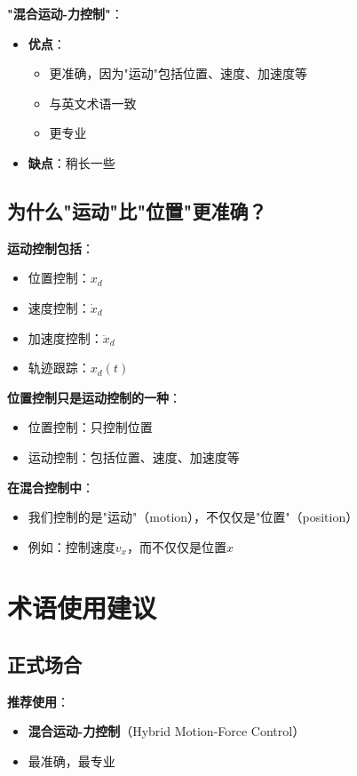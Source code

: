 \documentclass[12pt,a4paper]{article}
\begin{document}
\textbf{"混合运动-力控制"}：
\begin{itemize}
\item \textbf{优点}：
\begin{itemize}
\item 更准确，因为"运动"包括位置、速度、加速度等
\item 与英文术语一致
\item 更专业
\end{itemize}
\item \textbf{缺点}：稍长一些
\end{itemize}

\subsection{为什么"运动"比"位置"更准确？}

\textbf{运动控制包括}：
\begin{itemize}
\item 位置控制：$x_d$
\item 速度控制：$\dot{x}_d$
\item 加速度控制：$\ddot{x}_d$
\item 轨迹跟踪：$x_d(t)$
\end{itemize}

\textbf{位置控制只是运动控制的一种}：
\begin{itemize}
\item 位置控制：只控制位置
\item 运动控制：包括位置、速度、加速度等
\end{itemize}

\textbf{在混合控制中}：
\begin{itemize}
\item 我们控制的是"运动"（motion），不仅仅是"位置"（position）
\item 例如：控制速度$v_x$，而不仅仅是位置$x$
\end{itemize}

\section{术语使用建议}

\subsection{正式场合}

\textbf{推荐使用}：
\begin{itemize}
\item \textbf{混合运动-力控制}（Hybrid Motion-Force Control）
\item 最准确，最专业
\end{itemize}
\end{document}
